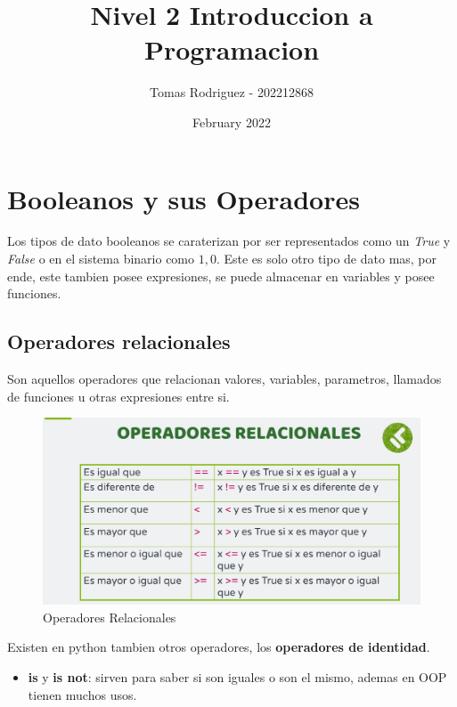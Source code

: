 \documentclass{article}
\title{Nivel 2 Introduccion a Programacion}
\author{Tomas Rodriguez - 202212868}
\date{February 2022}
\begin{document}
\maketitle
\section{Booleanos y sus Operadores}
Los tipos de dato booleanos se caraterizan por ser representados como un \textit{True} y \textit{False} o en el sistema binario como \(1,0\). Este es solo otro tipo de dato mas, por ende, este tambien posee expresiones, se puede almacenar en variables y posee funciones. 
\subsection{Operadores relacionales}
Son aquellos operadores que relacionan valores, variables, parametros, llamados de funciones u otras expresiones entre si. 
\begin{figure}[H]
    \centering
    \includegraphics[width=1\linewidth]{OperadoresRelacionales.png}
    \caption{Operadores Relacionales}
    \label{fig:enter-label}
\end{figure}
Existen en python tambien otros operadores, los \textbf{operadores de identidad}.
\begin{itemize}
    \item \textbf{is} y \textbf{is not}: sirven para saber si son iguales o son el mismo, ademas en OOP tienen muchos usos. 
\end{itemize}
\end{document}
